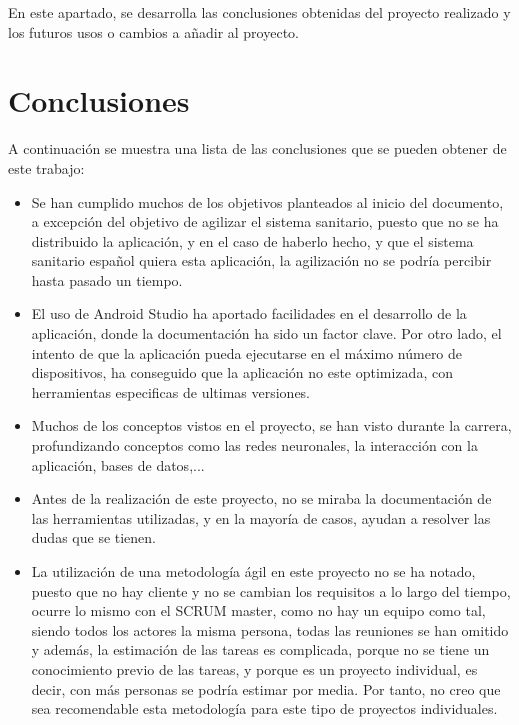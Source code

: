 
En este apartado, se desarrolla las conclusiones obtenidas del proyecto realizado y los futuros usos o cambios a añadir al proyecto.

\section{Conclusiones}

A continuación se muestra una lista de las conclusiones que se pueden obtener de este trabajo:

\begin{itemize}
    \item Se han cumplido muchos de los objetivos planteados al inicio del documento, a excepción del objetivo de agilizar el sistema sanitario, puesto que no se ha distribuido la aplicación, y en el caso de haberlo hecho, y que el sistema sanitario español quiera esta aplicación, la agilización no se podría percibir hasta pasado un tiempo.

    \item El uso de Android Studio ha aportado facilidades en el desarrollo de la aplicación, donde la documentación ha sido un factor clave. Por otro lado, el intento de que la aplicación pueda ejecutarse en el máximo número de dispositivos, ha conseguido que la aplicación no este optimizada, con herramientas especificas de ultimas versiones.

    \item Muchos de los conceptos vistos en el proyecto, se han visto durante la carrera, profundizando conceptos como las redes neuronales, la interacción con la aplicación, bases de datos,...

    \item Antes de la realización de este proyecto, no se miraba la documentación de las herramientas utilizadas, y en la mayoría de casos, ayudan a resolver las dudas que se tienen. 

    \item La utilización de una metodología ágil en este proyecto no se ha notado, puesto que no hay cliente y no se cambian los requisitos a lo largo del tiempo, ocurre lo mismo con el SCRUM master, como no hay un equipo como tal, siendo todos los actores la misma persona, todas las reuniones se han omitido y además, la estimación de las tareas es complicada, porque no se tiene un conocimiento previo de las tareas, y porque es un proyecto individual, es decir, con más personas se podría estimar por media. Por tanto, no creo que sea recomendable esta metodología para este tipo de proyectos individuales.

\end{itemize}


